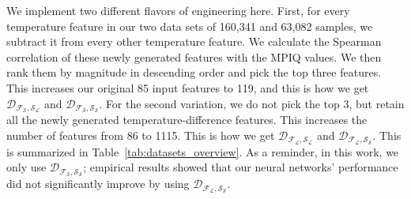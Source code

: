 \begin{enumerate}
We implement two different flavors of engineering here. First, for every temperature feature in our two data sets of 160,341 and 63,082 samples, we subtract it from every other temperature feature.  We calculate the Spearman correlation of these newly generated features with the MPIQ values.  We then rank them by magnitude in descending order and pick the top three features. This increases our original 85 input features to 119, and this is how we get $\mathcal{D_{F_S,S_L}}$ and $\mathcal{D_{F_S,S_S}}$. For the second variation, we do not pick the top 3, but retain all the newly generated temperature-difference features.  This increases the number of features from 86 to 1115. This is how we get $\mathcal{D_{F_L,S_L}}$ and $\mathcal{D_{F_L,S_S}}$. This is summarized in Table~\ref{tab:datasets_overview}. As a reminder, in this work, we only use $\mathcal{D_{F_S,S_S}}$; empirical results showed that our neural networks' performance did not significantly improve by using $\mathcal{D_{F_L,S_S}}$.
\end{enumerate}



